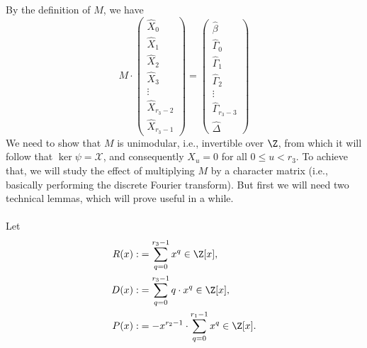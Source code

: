 By the definition of $M$, we have 
\begin{equation}\label{Mdef}
M\cdot
\begin{pmatrix}
\widehat{X}_0\\ 
\widehat{X}_1 \\
\widehat{X}_2 \\ 
\widehat{X}_3 \\ 
\vdots\\ 
\widehat{X}_{r_3-2}\\
\widehat{X}_{r_3-1}
\end{pmatrix}
=
\begin{pmatrix}
\widehat{\beta}\\ 
\widehat{\Gamma}_0\\ 
\widehat{\Gamma}_1\\ 
\widehat{\Gamma}_2 \\ 
\vdots\\ 
\widehat{\Gamma}_{r_3-3} \\ 
\widehat{\Delta}
\end{pmatrix}
\end{equation}
We need to show that $M$ is unimodular, i.e., invertible over $\Z$, from which it will follow that $\ker \psi=\mathcal{X}$, and consequently $X_u=0$ for all $0\le u <r_3$. To achieve that, we will study the effect of multiplying $M$ by a character matrix (i.e., basically performing the discrete Fourier transform). But first we will need two technical lemmas, which will prove useful in a while.
\paragraph*{}
Let
\begin{align*}
R(x):&=\sum_{q=0}^{r_3-1} x^q\in\Z[x],\\
D(x):&=\sum_{q=0}^{r_3-1}q\cdot x^q\in \Z[x],\\
P(x):&=-x^{r_2-1}\cdot \sum_{q=0}^{r_1-1} x^q\in \Z[x].
\end{align*}

